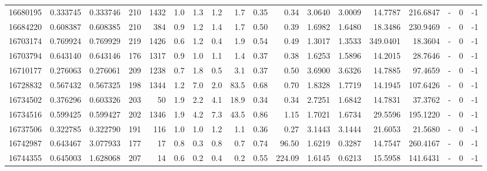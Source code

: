 \begin{tabular}{rrrrrrrrrrrrrrrlrr}
  16680195 & 0.333745 &   0.333746 &  210 & 1432 &      1.0 &      1.3 &     1.2 &      1.7 &       0.35 &        0.34 &  3.0640 &  3.0009 &   14.7787 &  216.6847 &             - &        0 &         -1 \\
  16684220 & 0.608387 &   0.608385 &  210 &  384 &      0.9 &      1.2 &     1.4 &      1.7 &       0.50 &        0.39 &  1.6982 &  1.6480 &   18.3486 &  230.9469 &             - &        0 &         -1 \\
  16703174 & 0.769924 &   0.769929 &  219 & 1426 &      0.6 &      1.2 &     0.4 &      1.9 &       0.54 &        0.49 &  1.3017 &  1.3533 &  349.0401 &   18.3604 &             - &        0 &         -1 \\
  16703794 & 0.643140 &   0.643146 &  176 & 1317 &      0.9 &      1.0 &     1.1 &      1.4 &       0.37 &        0.38 &  1.6253 &  1.5896 &   14.2015 &   28.7646 &             - &        0 &         -1 \\
  16710177 & 0.276063 &   0.276061 &  209 & 1238 &      0.7 &      1.8 &     0.5 &      3.1 &       0.37 &        0.50 &  3.6900 &  3.6326 &   14.7885 &   97.4659 &             - &        0 &         -1 \\
  16728832 & 0.567432 &   0.567325 &  198 & 1344 &      1.2 &      7.0 &     2.0 &     83.5 &       0.68 &        0.70 &  1.8328 &  1.7719 &   14.1945 &  107.6426 &             - &        0 &         -1 \\
  16734502 & 0.376296 &   0.603326 &  203 &   50 &      1.9 &      2.2 &     4.1 &     18.9 &       0.34 &        0.34 &  2.7251 &  1.6842 &   14.7831 &   37.3762 &             - &        0 &         -1 \\
  16734516 & 0.599425 &   0.599427 &  202 & 1346 &      1.9 &      4.2 &     7.3 &     43.5 &       0.86 &        1.15 &  1.7021 &  1.6734 &   29.5596 &  195.1220 &             - &        0 &         -1 \\
  16737506 & 0.322785 &   0.322790 &  191 &  116 &      1.0 &      1.0 &     1.2 &      1.1 &       0.36 &        0.27 &  3.1443 &  3.1444 &   21.6053 &   21.5680 &             - &        0 &         -1 \\
  16742987 & 0.643467 &   3.077933 &  177 &   17 &      0.8 &      0.3 &     0.8 &      0.7 &       0.74 &       96.50 &  1.6219 &  0.3287 &   14.7547 &  260.4167 &             - &        0 &         -1 \\
  16744355 & 0.645003 &   1.628068 &  207 &   14 &      0.6 &      0.2 &     0.4 &      0.2 &       0.55 &      224.09 &  1.6145 &  0.6213 &   15.5958 &  141.6431 &             - &        0 &         -1 \\

\end{tabular}
